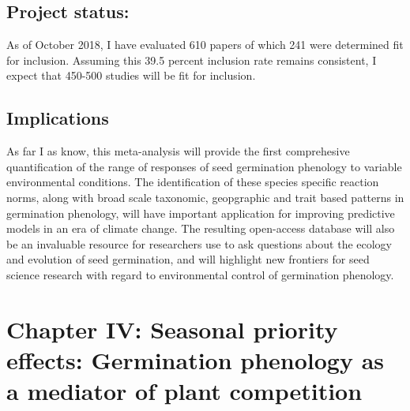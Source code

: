 \documentclass[12pt]{article}\usepackage[]{graphicx}\usepackage[]{color}
\begin{document}
\subsection*{Project status:}
As of October 2018, I have evaluated 610 papers of which 241 were determined fit for inclusion. Assuming this 39.5 percent inclusion rate remains consistent, I expect that 450-500 studies will be fit for inclusion.
\subsection*{Implications}
\indent\indent As far I as know, this meta-analysis will provide the first comprehesive quantification of the range of responses of seed germination phenology to variable environmental conditions. The identification of these species specific reaction norms, along with broad scale taxonomic, geopgraphic and trait based patterns in germination phenology, will have important application for improving predictive models in an era of climate change. The resulting open-access database will also be an invaluable resource for researchers use to ask questions about the ecology and evolution of seed germination, and will highlight new frontiers for seed science research with regard to environmental control of germination phenology.

\section*{Chapter IV: Seasonal priority effects: Germination phenology as a mediator of plant competition}
\end{document}
